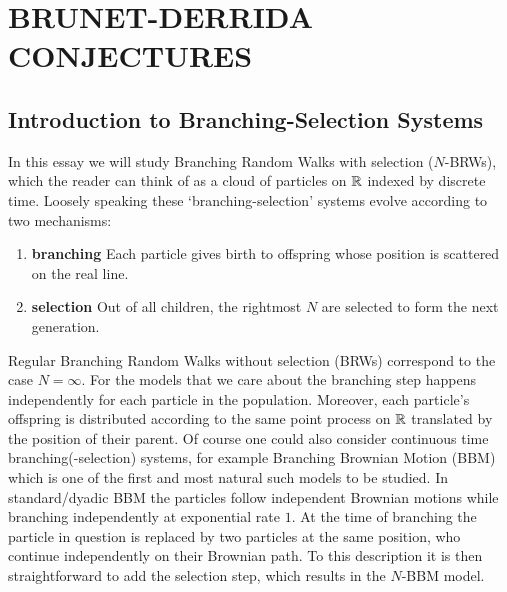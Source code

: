 \section{BRUNET-DERRIDA CONJECTURES}

\subsection{Introduction to Branching-Selection Systems}
In this essay we will study Branching Random Walks with selection ($N$-BRWs), which the reader can think of as a cloud of particles on $\mathbb{R}$ indexed by discrete time. Loosely speaking these `branching-selection' systems evolve according to two mechanisms: 
\begin{enumerate}[1]
\item \textbf{branching} Each particle gives birth to offspring whose position is scattered on the real line. 
\item \vspace{-2mm}\textbf{selection} Out of all children, the rightmost $N$ are selected to form the next generation.
\end{enumerate}
Regular Branching Random Walks without selection (BRWs) correspond to the case $N = \infty$. For the models that we care about the branching step happens independently for each particle in the population. Moreover, each particle's offspring is distributed according to the same point process on $\mathbb{R}$ translated by the position of their parent. Of course one could also consider continuous time branching(-selection) systems, for example Branching Brownian Motion (BBM) which is one of the first and most natural such models to be studied. In standard/dyadic BBM the particles follow independent Brownian motions while branching independently at exponential rate $1$. At the time of branching the particle in question is replaced by two particles at the same position, who continue independently on their Brownian path. To this description it is then straightforward to add the selection step, which results in the $N$-BBM model. \\

